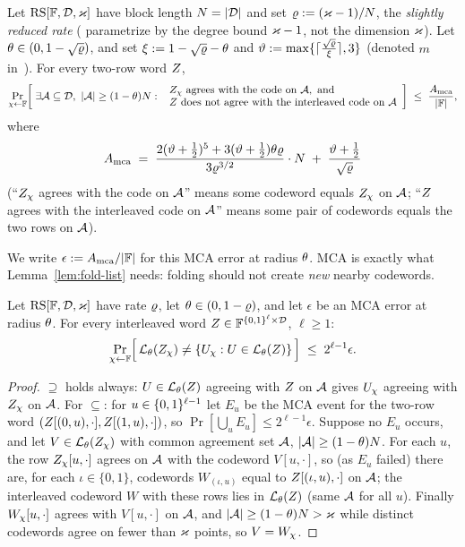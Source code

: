 \begin{theorem}\label{thm:mca-johnson}
Let $\mathrm{RS}[\mathbb{F},\mathcal{D},\varkappa]$ have block length $N = |\mathcal{D}|$ and set $\varrho := (\varkappa-1)/N$, the \emph{slightly reduced rate} (\cite{BCHKS25} parametrize by the degree bound $\varkappa - 1$, not the dimension $\varkappa$). Let $\theta \in (0, 1-\sqrt{\varrho})$, and set $\xi := 1 - \sqrt{\varrho} - \theta$ and $\vartheta := \max\{\lceil \tfrac{\sqrt{\varrho}}{\xi} \rceil, 3\}$ (denoted $m$ in~\cite{BCHKS25}). For every two-row word $Z$,
\[
\Pr_{\chi \leftarrow \mathbb{F}}\!\left[\; \exists \mathcal{A} \subseteq \mathcal{D},\ |\mathcal{A}| \ge (1-\theta) N :\ \begin{array}{l} Z_\chi \text{ agrees with the code on } \mathcal{A}, \text{ and} \\ Z \text{ does not agree with the interleaved code on } \mathcal{A} \end{array} \right] \;\le\; \frac{A_{\mathrm{mca}}}{|\mathbb{F}|},
\]
where
\[
A_{\mathrm{mca}} \;=\; \frac{2(\vartheta + \tfrac12)^5 + 3(\vartheta + \tfrac12)\theta\varrho}{3\varrho^{3/2}} \cdot N \;+\; \frac{\vartheta + \tfrac12}{\sqrt{\varrho}}
\]
(``$Z_\chi$ agrees with the code on $\mathcal{A}$'' means some codeword equals $Z_\chi$ on $\mathcal{A}$; ``$Z$ agrees with the interleaved code on $\mathcal{A}$'' means some pair of codewords equals the two rows on $\mathcal{A}$).
\end{theorem}

We write $\epsilon := A_{\mathrm{mca}}/|\mathbb{F}|$ for this MCA error at radius $\theta$. MCA is exactly what Lemma~\ref{lem:fold-list} needs: folding should not create \emph{new} nearby codewords.

\begin{lemma}\label{lem:fold-list}
Let $\mathrm{RS}[\mathbb{F},\mathcal{D},\varkappa]$ have rate $\varrho$, let $\theta \in (0, 1-\varrho)$, and let $\epsilon$ be an MCA error at radius $\theta$. For every interleaved word $Z \in \mathbb{F}^{\{0,1\}^{\ell} \times \mathcal{D}}$, $\ell \ge 1$:
\[
\Pr_{\chi \leftarrow \mathbb{F}}\Bigl[\, \mathcal{L}_\theta(Z_\chi) \neq \{ U_\chi : U \in \mathcal{L}_\theta(Z) \} \,\Bigr] \;\le\; 2^{\ell-1} \epsilon .
\]
\end{lemma}

\begin{proof}
$\supseteq$ holds always: $U \in \mathcal{L}_\theta(Z)$ agreeing with $Z$ on $\mathcal{A}$ gives $U_\chi$ agreeing with $Z_\chi$ on $\mathcal{A}$. For $\subseteq$: for $u \in \{0,1\}^{\ell-1}$ let $E_u$ be the MCA event for the two-row word $(Z[(0,u),\cdot], Z[(1,u),\cdot])$, so $\Pr[\bigcup_u E_u] \le 2^{\ell-1}\epsilon$. Suppose no $E_u$ occurs, and let $V \in \mathcal{L}_\theta(Z_\chi)$ with common agreement set $\mathcal{A}$, $|\mathcal{A}| \ge (1-\theta)N$. For each $u$, the row $Z_\chi[u,\cdot]$ agrees on $\mathcal{A}$ with the codeword $V[u,\cdot]$, so (as $E_u$ failed) there are, for each $\iota \in \{0,1\}$, codewords $W_{(\iota,u)}$ equal to $Z[(\iota,u),\cdot]$ on $\mathcal{A}$; the interleaved codeword $W$ with these rows lies in $\mathcal{L}_\theta(Z)$ (same $\mathcal{A}$ for all $u$). Finally $W_\chi[u,\cdot]$ agrees with $V[u,\cdot]$ on $\mathcal{A}$, and $|\mathcal{A}| \ge (1-\theta)N > \varkappa$ while distinct codewords agree on fewer than $\varkappa$ points, so $V = W_\chi$.
\end{proof}

